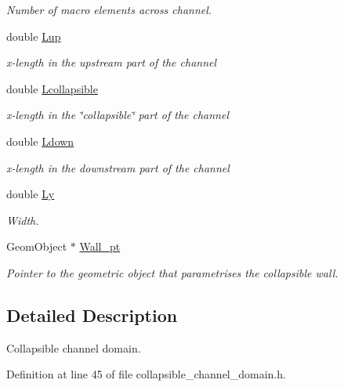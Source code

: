 \begin{DoxyCompactItemize}
\begin{DoxyCompactList}\small\item\em Number of macro elements across channel. \end{DoxyCompactList}\item 
double \hyperlink{classoomph_1_1CollapsibleChannelDomain_a1c4dbe3313e696290ad9da4765d0a0e1}{Lup}
\begin{DoxyCompactList}\small\item\em x-\/length in the upstream part of the channel \end{DoxyCompactList}\item 
double \hyperlink{classoomph_1_1CollapsibleChannelDomain_aa44cd6613cea2a67dda8f4de0d9c6f1e}{Lcollapsible}
\begin{DoxyCompactList}\small\item\em x-\/length in the \char`\"{}collapsible\char`\"{} part of the channel \end{DoxyCompactList}\item 
double \hyperlink{classoomph_1_1CollapsibleChannelDomain_ade4ee8220972fe6c454211d1f837fcf9}{Ldown}
\begin{DoxyCompactList}\small\item\em x-\/length in the downstream part of the channel \end{DoxyCompactList}\item 
double \hyperlink{classoomph_1_1CollapsibleChannelDomain_ac70912e194ac3e211cc0ce625c8f5c41}{Ly}
\begin{DoxyCompactList}\small\item\em Width. \end{DoxyCompactList}\item 
Geom\+Object $\ast$ \hyperlink{classoomph_1_1CollapsibleChannelDomain_a6f1ef65c47937800e35477863b1439ab}{Wall\+\_\+pt}
\begin{DoxyCompactList}\small\item\em Pointer to the geometric object that parametrises the collapsible wall. \end{DoxyCompactList}\end{DoxyCompactItemize}


\subsection{Detailed Description}
Collapsible channel domain. 

Definition at line 45 of file collapsible\+\_\+channel\+\_\+domain.\+h.



